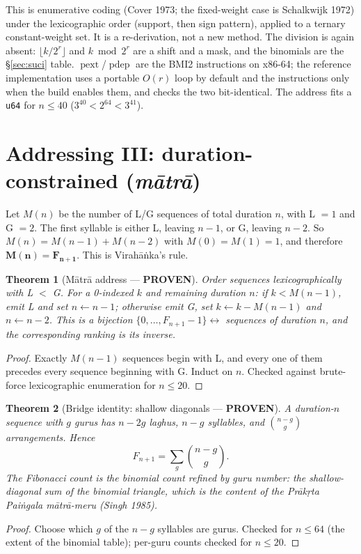 \documentclass[11pt,letterpaper]{article}
\newcommand{\tagbox}[2]{\textsf{\textbf{\color{#1}#2}}}
\newcommand{\PROVEN}{\tagbox{tagproven}{PROVEN}}
\newcommand{\skt}[1]{\textit{#1}}
\newcommand{\code}[1]{\texttt{#1}}
\DeclareMathOperator{\pext}{pext}
\DeclareMathOperator{\pdep}{pdep}
\theoremstyle{plain}
\newtheorem{theorem}{Theorem}
\theoremstyle{remark}
\begin{document}
This is enumerative coding (Cover 1973; the fixed-weight case is Schalkwijk 1972) under the lexicographic order (support, then sign pattern), applied to a ternary constant-weight set. It is a re-derivation, not a new method. The division is again absent: $\lfloor k/2^r \rfloor$ and $k \bmod 2^r$ are a shift and a mask, and the binomials are the §\ref{sec:suci} table. $\pext$/$\pdep$ are the BMI2 instructions on x86-64; the reference implementation uses a portable $O(r)$ loop by default and the instructions only when the build enables them, and checks the two bit-identical. The address fits a \code{u64} for $n \le 40$ ($3^{40} < 2^{64} < 3^{41}$).

\section{Addressing III: duration-constrained (\skt{mātrā})}\label{sec:matra}

Let $M(n)$ be the number of L/G sequences of total duration $n$, with L $=1$ and G $=2$. The first syllable is either L, leaving $n-1$, or G, leaving $n-2$. So $M(n) = M(n-1) + M(n-2)$ with $M(0) = M(1) = 1$, and therefore $\mathbf{M(n) = F_{n+1}}$. This is Virahāṅka's rule.

\begin{theorem}[Mātrā address \textup{---} \PROVEN]\label{thm:matra}
Order sequences lexicographically with L $<$ G. For a 0-indexed $k$ and remaining duration $n$: if $k < M(n-1)$, emit L and set $n \leftarrow n-1$; otherwise emit G, set $k \leftarrow k - M(n-1)$ and $n \leftarrow n-2$. This is a bijection $\{0,\dots,F_{n+1}-1\} \leftrightarrow$ sequences of duration $n$, and the corresponding ranking is its inverse.
\end{theorem}
\begin{proof}
Exactly $M(n-1)$ sequences begin with L, and every one of them precedes every sequence beginning with G. Induct on $n$. Checked against brute-force lexicographic enumeration for $n \le 20$.
\end{proof}

\begin{theorem}[Bridge identity: shallow diagonals \textup{---} \PROVEN]\label{thm:bridge}
A duration-$n$ sequence with $g$ gurus has $n-2g$ laghus, $n-g$ syllables, and $\binom{n-g}{g}$ arrangements. Hence
\[
F_{n+1} = \sum_{g} \binom{n-g}{g}.
\]
The Fibonacci count is the binomial count refined by guru number: the shallow-diagonal sum of the binomial triangle, which is the content of the \skt{Prākṛta Paiṅgala} \skt{mātrā-meru} (Singh 1985).
\end{theorem}
\begin{proof}
Choose which $g$ of the $n-g$ syllables are gurus. Checked for $n \le 64$ (the extent of the binomial table); per-guru counts checked for $n \le 20$.
\end{proof}
\end{document}
